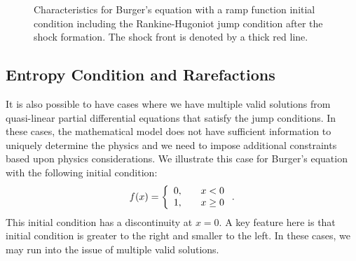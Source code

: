 \begin{figure}[tb!]
\begin{center}
\caption{Characteristics for Burger's equation with a ramp function initial condition including the Rankine-Hugoniot jump condition after the shock formation. The shock front is denoted by a thick red line.}
\label{Fig:pde_burgerEquationCharacteristics_RampFunction_Revised}
\end{center}
\end{figure}


\subsection{Entropy Condition and Rarefactions}

It is also possible to have cases where we have multiple valid solutions from quasi-linear partial differential equations that satisfy the jump conditions. In these cases, the mathematical model does not have sufficient information to uniquely determine the physics and we need to impose additional constraints based upon physics considerations. We illustrate this case for Burger's equation with the following initial condition:
\begin{align}
  f(x) = \left\{ \begin{array}{r l} 
  0, & \quad x < 0 \\
  1, & \quad x \ge 0 \\ \end{array} \right. . 
\end{align}
This initial condition has a discontinuity at $x = 0$. A key feature here is that initial condition is greater to the right and smaller to the left. In these cases, we may run into the issue of multiple valid solutions.

